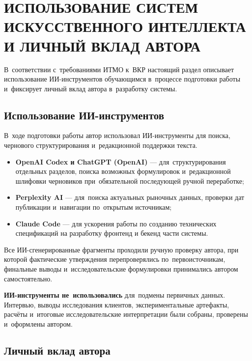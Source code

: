\chapter*{ИСПОЛЬЗОВАНИЕ СИСТЕМ ИСКУССТВЕННОГО ИНТЕЛЛЕКТА И ЛИЧНЫЙ ВКЛАД АВТОРА}
\sloppy

В~соответствии с~требованиями ИТМО к~ВКР настоящий раздел
описывает использование ИИ-инструментов обучающимся в~процессе подготовки работы
и~фиксирует личный вклад автора в~разработку системы.

\section*{Использование ИИ-инструментов}

В~ходе подготовки работы автор использовал ИИ-инструменты для
поиска, чернового структурирования и~редакционной поддержки текста.

\begin{itemize}
  \item \textbf{OpenAI Codex и ChatGPT (OpenAI)} — для~структурирования
    отдельных разделов, поиска возможных формулировок и~редакционной
    шлифовки черновиков при~обязательной последующей ручной переработке;
  \item \textbf{Perplexity AI} — для~поиска актуальных рыночных данных,
    проверки дат публикации и~навигации по~открытым источникам;
  \item \textbf{Claude Code} — для ускорения работы по созданию технических спецификаций
    на разработку фронтенд и бекенд части системы.
\end{itemize}

Все ИИ-сгенерированные фрагменты проходили ручную проверку автора, при которой
фактические утверждения перепроверялись по~первоисточникам,
финальные выводы и~исследовательские формулировки принимались
автором самостоятельно.

\textbf{ИИ-инструменты не~использовались} для~подмены первичных данных.
Интервью, выводы исследования клиентов, экспериментальные артефакты, расчёты и~итоговые
исследовательские интерпретации были собраны, проверены и~оформлены
автором.

\section*{Личный вклад автора}

